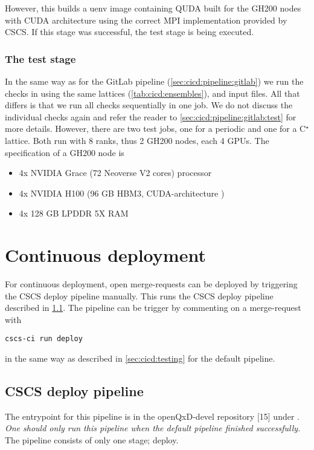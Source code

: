 However, this builds a uenv image containing QUDA built for the GH200 nodes with CUDA architecture  using the correct MPI implementation provided by CSCS. If this stage was successful, the test stage is being executed.

\subsubsection{The test stage}

In the same way as for the GitLab pipeline (\cref{sec:cicd:pipeline:gitlab}) we run the checks in  using the same lattices (\cref{tab:cicd:ensembles}), and input files. All that differs is that we run all checks sequentially in one job. We do not discuss the individual checks again and refer the reader to \cref{sec:cicd:pipeline:gitlab:test} for more details. However, there are two test jobs, one for a periodic and one for a C$^{\star}$ lattice. Both run with 8 ranks, thus 2 GH200 nodes, each 4 GPUs. The specification of a GH200 node is
\begin{itemize}
    \item 4x NVIDIA Grace (72 Neoverse V2 cores) processor
    \item 4x NVIDIA H100 (96 GB HBM3, CUDA-architecture )
    \item 4x 128 GB LPDDR 5X RAM
\end{itemize}

\section{Continuous deployment}

For continuous deployment, open merge-requests can be deployed by triggering the CSCS deploy pipeline manually. This runs the CSCS deploy pipeline described in \cref{sec:cd:pipeline:cscs}. The pipeline can be trigger by commenting on a merge-request with
\begin{verbatim}
cscs-ci run deploy
\end{verbatim}
in the same way as described in \cref{sec:cicd:testing} for the default pipeline.

\subsection{CSCS deploy pipeline}
\label{sec:cd:pipeline:cscs}

The entrypoint for this pipeline is in the openQxD-devel repository [15] under . \emph{One should only run this pipeline when the default pipeline finished successfully.} The pipeline consists of only one stage; deploy.


